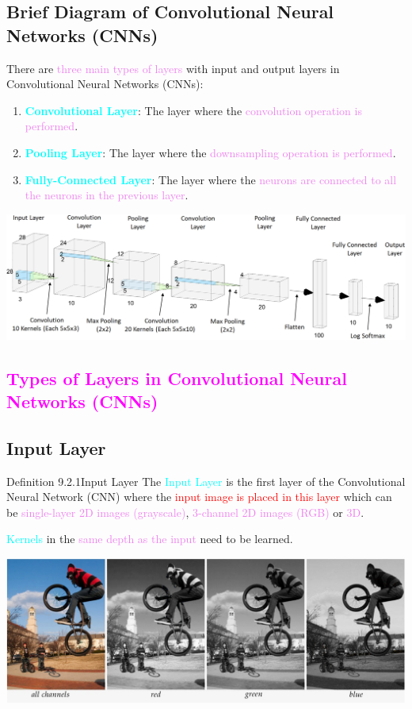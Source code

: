 \documentclass{book}
\begin{document}
\subsection{Brief Diagram of Convolutional Neural Networks (CNNs)}
There are \textcolor{violet}{three main types of layers} with input and output layers in Convolutional Neural Networks (CNNs):
\begin{enumerate}
    \item \textcolor{cyan}{\textbf{Convolutional Layer}}: The layer where the \textcolor{violet}{convolution operation is performed}.
    \item \textcolor{cyan}{\textbf{Pooling Layer}}: The layer where the \textcolor{violet}{downsampling operation is performed}.
    \item \textcolor{cyan}{\textbf{Fully-Connected Layer}}: The layer where the \textcolor{violet}{neurons are connected to all the neurons in the previous layer}.
\end{enumerate}
\begin{center}
    \includegraphics[scale=0.23]{chapter 9/ch9_figure4.jpeg}
\end{center}
\textcolor{magenta}{\section{\textbf{Types of Layers in Convolutional Neural Networks (CNNs)}}}
\subsection{Input Layer}
\begin{defBox}{Definition 9.2.1}{Input Layer}
    The \textcolor{cyan}{Input Layer} is the first layer of the Convolutional Neural Network (CNN) where the \textcolor{red}{input image is placed in this layer} which can be \textcolor{violet}{single-layer 2D images (grayscale)}, \textcolor{violet}{3-channel 2D images (RGB)} or \textcolor{violet}{3D}.
\end{defBox}
\textcolor{cyan}{Kernels} in the \textcolor{violet}{same depth as the input} need to be learned.
\begin{center}
    \includegraphics[scale=0.21]{chapter 9/ch9_figure5.jpeg}
\end{center}
\newpage
\end{document}
